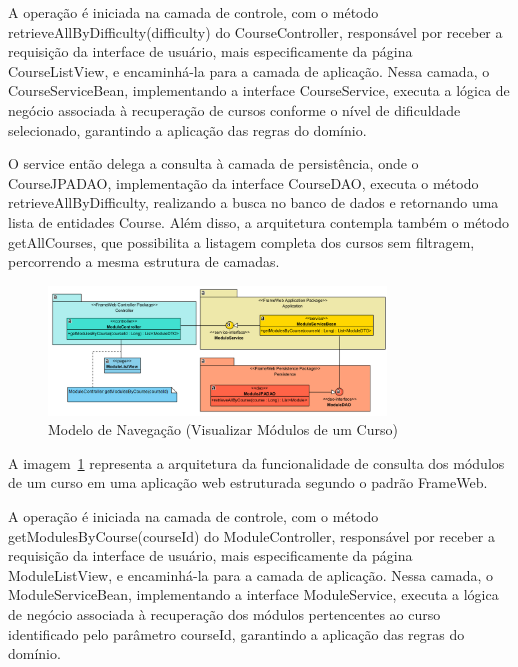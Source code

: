 A operação é iniciada na camada de controle, com o método \textsf{retrieveAllByDifficulty(difficulty)} do \textsf{CourseController}, responsável por receber a requisição da interface de usuário, mais especificamente da página \textsf{CourseListView}, e encaminhá-la para a camada de aplicação. Nessa camada, o \textsf{CourseServiceBean}, implementando a interface \textsf{CourseService}, executa a lógica de negócio associada à recuperação de cursos conforme o nível de dificuldade selecionado, garantindo a aplicação das regras do domínio.

O \textsf{service} então delega a consulta à camada de persistência, onde o \textsf{CourseJPADAO}, implementação da interface \textsf{CourseDAO}, executa o método \textsf{retrieveAllByDifficulty}, realizando a busca no banco de dados e retornando uma lista de entidades \textsf{Course}. Além disso, a arquitetura contempla também o método \textsf{getAllCourses}, que possibilita a listagem completa dos cursos sem filtragem, percorrendo a mesma estrutura de camadas.

\begin{figure}[h]
	\centering
	\includegraphics[width=0.8\textwidth]{figuras/visualizarModulosCurso.png}
	\caption{Modelo de Navegação (\textsf{Visualizar Módulos de um Curso})}
	\label{visualizarModulosCurso}
\end{figure}

A imagem~\ref{visualizarModulosCurso} representa a arquitetura da funcionalidade de consulta dos módulos de um curso em uma aplicação web estruturada segundo o padrão \textsf{FrameWeb}.

A operação é iniciada na camada de controle, com o método \textsf{getModulesByCourse(courseId)} do \textsf{ModuleController}, responsável por receber a requisição da interface de usuário, mais especificamente da página \textsf{ModuleListView}, e encaminhá-la para a camada de aplicação. Nessa camada, o \textsf{ModuleServiceBean}, implementando a interface \textsf{ModuleService}, executa a lógica de negócio associada à recuperação dos módulos pertencentes ao curso identificado pelo parâmetro \textsf{courseId}, garantindo a aplicação das regras do domínio.

